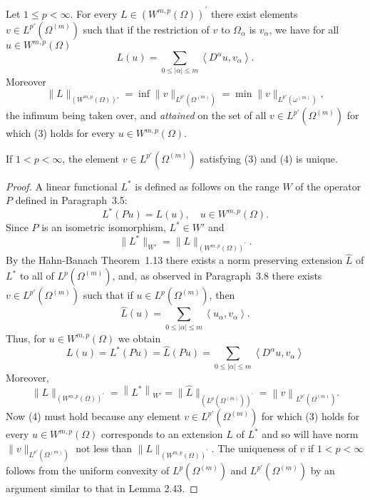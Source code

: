 \begin{theorem}
  Let $1 \leq p<\infty$. For every $L \in\left(W^{m,p}(\Omega)\right)^{\prime}$ there exist 
  elements $v \in L^{p'}(\Omega^{(m)})$ such that if the restriction of $v$ to 
  $\Omega_\alpha$ is $v_\alpha$, we have for all $u \in W^{m,p}(\Omega)$
  \begin{equation}\label{eq:3.3}
  L(u)=\sum_{0 \leq|\alpha| \leq m}\left\langle D^\alpha u, v_\alpha\right\rangle .
  \end{equation}
  Moreover
  \begin{equation}\label{eq:3.4}
    \|L\|_{(W^{m,p}(\Omega))'} = \inf \|v\|_{L^{p'}(\Omega^{(m)})}
    = \min \|v\|_{L^{p'}(\omega^{(m)})},
  \end{equation}
  the infimum being taken over, and \emph{attained} on the set of all $v\in L^{p'}(\Omega^{(m)})$
  for which (3) holds for every $u\in W^{m,p}(\Omega)$.

  If $1<p<\infty$, the element $v \in L^{p'}(\Omega^{(m)})$ satisfying (3) and (4) is unique.
\end{theorem}


\begin{proof}
  A linear functional $L^*$ is defined as follows on the range $W$ of the operator $P$
  defined in Paragraph~3.5:
  \[
  L^*(Pu) = L(u), \quad u \in W^{m,p}(\Omega) .
  \]
  Since $P$ is an isometric isomorphism, $L^* \in W'$ and
  \[
  \|L^*\|_{W'} = \|L\|_{\left(W^{m,p}(\Omega)\right)^{\prime}} .
  \]
  By the Hahn-Banach Theorem~1.13 there exists a norm preserving extension $\hat{L}$ of $L^*$
  to all of $L^p(\Omega^{(m)})$, and, as observed in Paragraph~3.8
  there exists $v \in L^{p'}(\Omega^{(m)})$ such that if $u \in L^p(\Omega^{(m)})$, then
  \[
  \hat{L}(u) = \sum_{0 \leq|\alpha| \leq m}\left\langle u_\alpha, v_\alpha\right\rangle .
  \]
  Thus, for $u \in W^{m,p}(\Omega)$ we obtain
  \[
  L(u)=L^*(P u)=\hat{L}(P u)=\sum_{0 \leq|\alpha| \leq m}\left\langle D^\alpha u, v_\alpha\right\rangle
  \]
  Moreover,
  \[
  \|L\|_{\left(W^{m,p}(\Omega)\right)^{\prime}}
    = \left\|L^*\right\|_{W'}
    = \|\hat{L}\|_{\left(L^p(\Omega^{(m)})\right)^{\prime}}
    = \left\|v\right\|_{L^{p'}(\Omega^{(m)})} .
  \]
  Now (4) must hold because any element $v \in L^{p'}(\Omega^{(m)})$ for which (3) holds for every $u \in W^{m,p}(\Omega)$ corresponds to an extension $L$ of $L^*$ and so will have norm $\|v\|_{L^{p'}(\Omega^{(m)})}$ not less than $\|L\|_{\left(W^{m,p}(\Omega)\right)^{\prime}}$.
  The uniqueness of $v$ if $1<p<\infty$ follows from the uniform convexity of $L^p(\Omega^{(m)})$ and $L^{p'}(\Omega^{(m)})$ by an argument similar to that in Lemma 2.43.
\end{proof}


